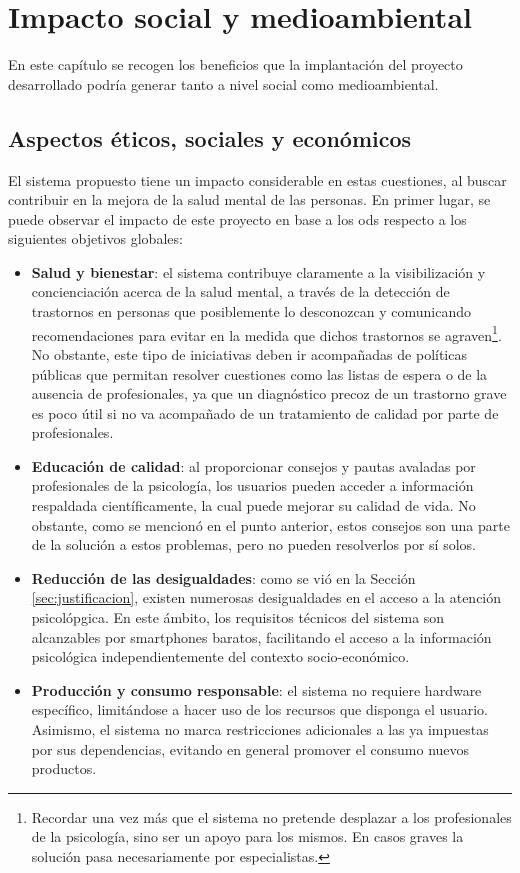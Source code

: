 \chapter{Impacto social y medioambiental}
\label{chapter:aspectos}


En este capítulo se recogen los beneficios que la implantación del proyecto desarrollado podría generar tanto a nivel social como medioambiental.

\section{Aspectos éticos, sociales y económicos}
    El sistema propuesto tiene un impacto considerable en estas cuestiones, al buscar contribuir en la mejora de la salud mental de las personas. En primer lugar, se puede observar el impacto de este proyecto en base a los \gls{ods} respecto a los siguientes objetivos globales:

    \begin{itemize}
        \item \textbf{Salud y bienestar}: el sistema contribuye claramente a la visibilización y concienciación acerca de la salud mental, a través de la detección de trastornos en personas que posiblemente lo desconozcan y comunicando recomendaciones para evitar en la medida que dichos trastornos se agraven\footnote{Recordar una vez más que el sistema no pretende desplazar a los profesionales de la psicología, sino ser un apoyo para los mismos. En casos graves la solución pasa necesariamente por especialistas.}. No obstante, este tipo de iniciativas deben ir acompañadas de políticas públicas que permitan resolver cuestiones como las listas de espera o de la ausencia de profesionales, ya que un diagnóstico precoz de un trastorno grave es poco útil si no va acompañado de un tratamiento de calidad por parte de profesionales.
        \item \textbf{Educación de calidad}: al proporcionar consejos y pautas avaladas por profesionales de la psicología, los usuarios pueden acceder a información respaldada científicamente, la cual puede mejorar su calidad de vida. No obstante, como se mencionó en el punto anterior, estos consejos son una parte de la solución a estos problemas, pero no pueden resolverlos por sí solos.
        \item \textbf{Reducción de las desigualdades}: como se vió en la Sección \ref{sec:justificacion}, existen numerosas desigualdades en el acceso a la atención psicolópgica. En este ámbito, los requisitos técnicos del sistema son alcanzables por \glspl{smartphone} baratos, facilitando el acceso a la información psicológica independientemente del contexto socio-económico.
        \item \textbf{Producción y consumo responsable}: el sistema no requiere hardware específico, limitándose a hacer uso de los recursos que disponga el usuario. Asimismo, el sistema no marca restricciones adicionales a las ya impuestas por sus dependencias, evitando en general promover el consumo nuevos productos.
    \end{itemize}

